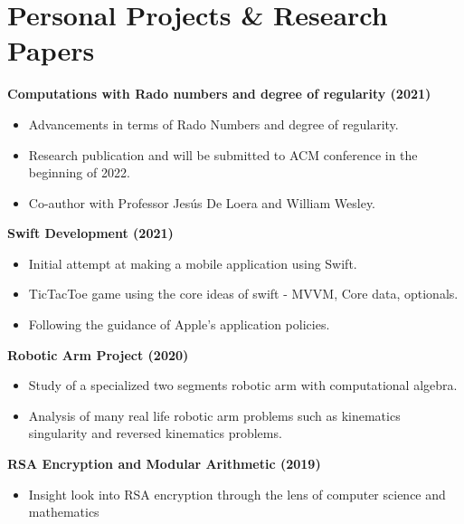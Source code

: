 \section{\sc Personal Projects \& Research Papers}

{\bf{Computations with Rado numbers and degree of regularity} (2021)}\\
\begin{itemize}
\setlength\itemsep{0em}
\item Advancements in terms of Rado Numbers and degree of regularity.
\item Research publication and will be submitted to ACM conference in the beginning of 2022.
\item Co-author with Professor Jes\'{u}s De Loera and William Wesley.
\end{itemize}

{\bf{Swift Development} (2021)}\\
\begin{itemize}
\setlength\itemsep{0em}
\item Initial attempt at making a mobile application using Swift.
\item TicTacToe game using the core ideas of swift - MVVM, Core data, optionals.
\item Following the guidance of Apple's application policies. 
\end{itemize}

{\bf{Robotic Arm Project} (2020)}\\
\begin{itemize}
\setlength\itemsep{0em}
\item Study of a specialized two segments robotic arm with computational algebra.
\item Analysis of many real life robotic arm problems such as kinematics singularity and reversed kinematics problems. 
\end{itemize}

{\bf{RSA Encryption and Modular Arithmetic} (2019)}\\
\begin{itemize}
\setlength\itemsep{0em}
\item Insight look into RSA encryption through the lens of computer science and mathematics
\end{itemize}



\endinput